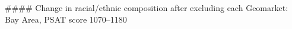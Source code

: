 #### Change in racial/ethnic composition after excluding each Geomarket: Bay Area, PSAT score 1070–1180
